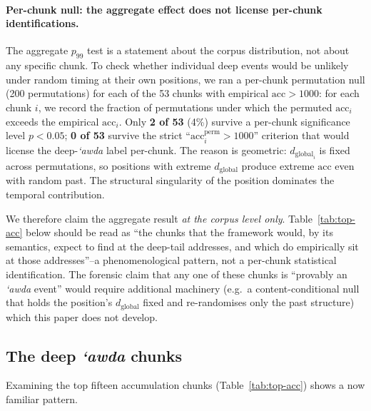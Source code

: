 \documentclass[11pt,a4paper]{article}
\theoremstyle{definition}
\newcommand{\dglobal}{d_{\mathrm{global}}}
\begin{document}
\paragraph{Per-chunk null: the aggregate effect does not license
per-chunk identifications.} The aggregate $p_{99}$ test is a
statement about the corpus distribution, not about any specific
chunk. To check whether individual deep events would be unlikely
under random timing at their own positions, we ran a per-chunk
permutation null (200 permutations) for each of the 53 chunks with
empirical $\mathrm{acc} > 1000$: for each chunk $i$, we record the
fraction of permutations under which the permuted $\mathrm{acc}_i$
exceeds the empirical $\mathrm{acc}_i$.
Only \textbf{2 of 53} (4\%) survive a per-chunk significance level
$p < 0.05$; \textbf{0 of 53} survive the strict
``$\mathrm{acc}_i^{\text{perm}} > 1000$'' criterion that would license
the deep-\emph{`awda} label per-chunk. The reason is geometric:
$\dglobal_i$ is fixed across permutations, so positions with
extreme $\dglobal$ produce extreme $\mathrm{acc}$ even with random
past. The structural singularity of the position dominates the
temporal contribution.

We therefore claim the aggregate result \emph{at the corpus level
only}. Table~\ref{tab:top-acc} below should be read as ``the chunks
that the framework would, by its semantics, expect to find at the
deep-tail addresses, and which do empirically sit at those
addresses''--a phenomenological pattern, not a per-chunk statistical
identification. The forensic claim that any one of these chunks is
``provably an \emph{`awda} event'' would require additional
machinery (e.g.\ a content-conditional null that holds the position's
$\dglobal$ fixed and re-randomises only the past structure) which
this paper does not develop.

\subsection{The deep \emph{`awda} chunks}

Examining the top fifteen accumulation chunks (Table~\ref{tab:top-acc})
shows a now familiar pattern.
\end{document}
